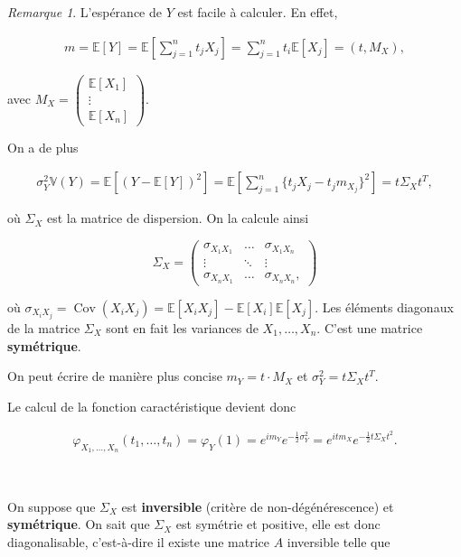 \documentclass[french]{book}
\theoremstyle{definition}
\theoremstyle{remark}
\newtheorem*{remark}{Remarque}
\begin{document}
\begin{remark}
  L'espérance de \(Y\) est facile à calculer. En effet,

  \begin{gather*}
    m = \mathbb{E}[Y] = \mathbb{E}\left[\sum_{j=1}^{n} t_j X_j \right] = \sum_{j=1}^{n}t_i \mathbb{E}[X_j] = (t,M_X),
  \end{gather*}

  avec \(M_X = \begin{pmatrix}
  \mathbb{E}[X_1] \\
  \vdots \\
  \mathbb{E}[X_n]
  \end{pmatrix}\).

  On a de plus

  \begin{gather*}
    \sigma_Y ^2 \mathbb{V}(Y) = \mathbb{E}[(Y - \mathbb{E}[Y])^2] = \mathbb{E}\left[\sum_{j=1}^{n} \{ t_j X_j - t_j m _{X_j} \}^2\right] = t  \Sigma_{X} t ^{T},
  \end{gather*}

  où \(\Sigma_{X}\) est la matrice de dispersion. On la calcule ainsi

  \[\Sigma_X = \begin{pmatrix}
  \sigma _{X_1 X_1} & \dots & \sigma _{X_1 X_n} \\
  \vdots & \ddots & \vdots \\
  \sigma _{X_n X_1} & \dots & \sigma _{X_n X_n},
  \end{pmatrix}\]

  où \(\sigma _{X_i X_j} = \operatorname{Cov}(X_i X_j) = \mathbb{E}[X_i X_j] - \mathbb{E}[X_i]\mathbb{E}[X_j]\). Les éléments diagonaux de la matrice \(\Sigma_X\) sont en fait les variances de \(X_1, \dots, X_n\). C'est une matrice \textbf{symétrique}.

  On peut écrire de manière plus concise \(m_Y = t \cdot M_X\) et \(\sigma_Y ^2 = t \Sigma_X t ^{T}\).
\end{remark}

Le calcul de la fonction caractéristique devient donc

\begin{gather*}
  \varphi _{X_1, \dots, X_n}(t_1, \dots, t_n) = \varphi_Y(1) = e^{im_Y}e^{-\frac{1}{2}\sigma_Y ^2} = e^{it m_X} e^{-\frac{1}{2}t \Sigma_X t ^2}.
\end{gather*}

\

On suppose que \(\Sigma_X\) est \textbf{inversible} (critère de non-dégénérescence) et \textbf{symétrique}. On sait que \(\Sigma_X\) est symétrie et positive, elle est donc diagonalisable, c'est-à-dire il existe une matrice \(A\) inversible telle que
\end{document}
